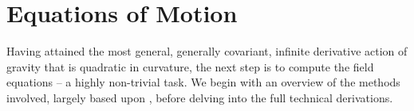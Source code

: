 %
\section{Equations of Motion}
Having attained the most general, generally covariant, infinite derivative action of gravity that is quadratic in curvature, the next step is to compute the field equations -- a highly non-trivial task. We begin with an overview of the methods involved, largely based upon \cite{Biswas:2013cha}, before delving into the full technical derivations.
